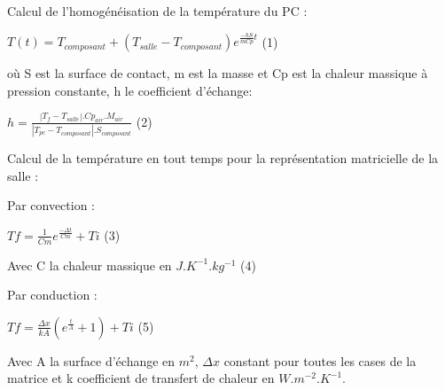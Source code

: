 \documentclass{article}
\begin{document}
\begin{flushleft}
\begin{Large}
Calcul de l'homog\'en\'eisation de la temp\'erature du PC :
\par\leavevmode\par

$T(t) = T_{composant} + (T_{salle} - T_{composant})e^{\frac{-hS}{mCp}t}$ (1)
\\
\par\leavevmode\par
o\`u S est la surface de contact, m est la masse et Cp est la chaleur massique \`a pression constante, h le coefficient d'\'echange:
\\
\par\leavevmode\par
$h =  \frac{|T_{f} - T_{salle}|  . Cp_{air} . M_{air}}{|T_{pc}-T_{composant}|.S_{composant}} $ (2)

\par\leavevmode\par
\par\leavevmode\par
Calcul de la temp\'erature en tout temps pour la repr\'esentation matricielle de la salle :
\par\leavevmode\par
Par convection :
\par\leavevmode\par

$Tf = \frac{1}{Cm}e^{\frac{-\Delta t}{Cm}}+Ti$ (3)
\par\leavevmode\par

Avec C la chaleur massique en $J.K^{-1}.kg^{-1}$ (4)
\par\leavevmode\par
Par conduction :
\par\leavevmode\par
$Tf = \frac{\Delta x}{kA}(e^{\frac{t}{A}}+1)+Ti$ (5)
\par\leavevmode\par

Avec A la surface d'\'echange en $m^{2}$, $\Delta x$ constant pour toutes les cases de la matrice et k coefficient de transfert de chaleur en $W.m^{-2}.K^{-1}$.



\par\leavevmode\par
\par\leavevmode\par
\par\leavevmode\par


\end{Large}
\end{flushleft}
\end{document}
